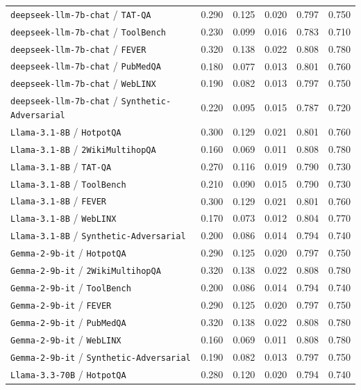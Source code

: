 \begin{longtable}{lccccc}
\texttt{deepseek-llm-7b-chat} / \texttt{TAT-QA} & 0.290 & 0.125 & 0.020 & 0.797 & 0.750 \\
\texttt{deepseek-llm-7b-chat} / \texttt{ToolBench} & 0.230 & 0.099 & 0.016 & 0.783 & 0.710 \\
\texttt{deepseek-llm-7b-chat} / \texttt{FEVER} & 0.320 & 0.138 & 0.022 & 0.808 & 0.780 \\
\texttt{deepseek-llm-7b-chat} / \texttt{PubMedQA} & 0.180 & 0.077 & 0.013 & 0.801 & 0.760 \\
\texttt{deepseek-llm-7b-chat} / \texttt{WebLINX} & 0.190 & 0.082 & 0.013 & 0.797 & 0.750 \\
\texttt{deepseek-llm-7b-chat} / \texttt{Synthetic-Adversarial} & 0.220 & 0.095 & 0.015 & 0.787 & 0.720 \\
\texttt{Llama-3.1-8B} / \texttt{HotpotQA} & 0.300 & 0.129 & 0.021 & 0.801 & 0.760 \\
\texttt{Llama-3.1-8B} / \texttt{2WikiMultihopQA} & 0.160 & 0.069 & 0.011 & 0.808 & 0.780 \\
\texttt{Llama-3.1-8B} / \texttt{TAT-QA} & 0.270 & 0.116 & 0.019 & 0.790 & 0.730 \\
\texttt{Llama-3.1-8B} / \texttt{ToolBench} & 0.210 & 0.090 & 0.015 & 0.790 & 0.730 \\
\texttt{Llama-3.1-8B} / \texttt{FEVER} & 0.300 & 0.129 & 0.021 & 0.801 & 0.760 \\
\texttt{Llama-3.1-8B} / \texttt{WebLINX} & 0.170 & 0.073 & 0.012 & 0.804 & 0.770 \\
\texttt{Llama-3.1-8B} / \texttt{Synthetic-Adversarial} & 0.200 & 0.086 & 0.014 & 0.794 & 0.740 \\
\texttt{Gemma-2-9b-it} / \texttt{HotpotQA} & 0.290 & 0.125 & 0.020 & 0.797 & 0.750 \\
\texttt{Gemma-2-9b-it} / \texttt{2WikiMultihopQA} & 0.320 & 0.138 & 0.022 & 0.808 & 0.780 \\
\texttt{Gemma-2-9b-it} / \texttt{ToolBench} & 0.200 & 0.086 & 0.014 & 0.794 & 0.740 \\
\texttt{Gemma-2-9b-it} / \texttt{FEVER} & 0.290 & 0.125 & 0.020 & 0.797 & 0.750 \\
\texttt{Gemma-2-9b-it} / \texttt{PubMedQA} & 0.320 & 0.138 & 0.022 & 0.808 & 0.780 \\
\texttt{Gemma-2-9b-it} / \texttt{WebLINX} & 0.160 & 0.069 & 0.011 & 0.808 & 0.780 \\
\texttt{Gemma-2-9b-it} / \texttt{Synthetic-Adversarial} & 0.190 & 0.082 & 0.013 & 0.797 & 0.750 \\
\texttt{Llama-3.3-70B} / \texttt{HotpotQA} & 0.280 & 0.120 & 0.020 & 0.794 & 0.740 \\

\end{longtable}
